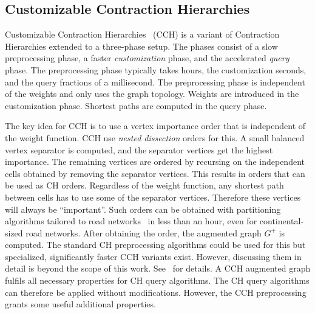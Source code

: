 \documentclass[manuscript]{acmart}
\begin{document}
\subsection{Customizable Contraction Hierarchies}
\label{sec:cch-intro}

Customizable Contraction Hierarchies~\cite{dsw-cch-15} (CCH) is a variant of Contraction Hierarchies extended to a three-phase setup.
The phases consist of a slow preprocessing phase, a faster \emph{customization} phase, and the accelerated \emph{query} phase.
The preprocessing phase typically takes hours, the customization seconds, and the query fractions of a millisecond.
The preprocessing phase is independent of the weights and only uses the graph topology.
Weights are introduced in the customization phase.
Shortest paths are computed in the query phase.

The key idea for CCH is to use a vertex importance order that is independent of the weight function.
CCH use \emph{nested dissection} orders for this.
A small balanced vertex separator is computed, and the separator vertices get the highest importance.
The remaining vertices are ordered by recursing on the independent cells obtained by removing the separator vertices.
This results in orders that can be used as CH orders.
Regardless of the weight function, any shortest path between cells has to use some of the separator vertices.
Therefore these vertices will always be ``important''.
Such orders can be obtained with partitioning algorithms tailored to road networks~\cite{GottesburenHUW19,hs-gbpo-18} in less than an hour, even for continental-sized road networks.
After obtaining the order, the augmented graph $G^+$ is computed.
The standard CH preprocessing algorithms could be used for this but specialized, significantly faster CCH variants exist.
However, discussing them in detail is beyond the scope of this work.
See~\cite{dsw-cch-15,DBLP:journals/jea/Buchhold0W19} for details.
A CCH augmented graph fulfils all necessary properties for CH query algorithms.
The CH query algorithms can therefore be applied without modifications.
However, the CCH preprocessing grants some useful additional properties.
\end{document}
